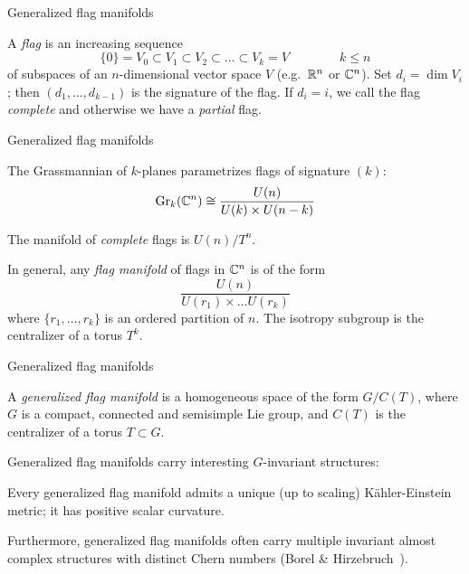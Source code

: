 \documentclass[11pt,parskip]{beamer}
\begin{document}
\begin{frame}{Generalized flag manifolds}
	\begin{mydef}
		A \emph{flag} is an increasing sequence 
		\begin{equation*}
			\{0\}=V_0\subset V_1 \subset V_2 \subset \dots \subset V_k=V \qquad \qquad k\leq n
		\end{equation*}
		of subspaces of an $n$-dimensional vector space $V$ (e.g.~$\mathbb{R}^n$ or $\mathbb{C}^n$). Set $d_i=\dim V_i$; then $(d_1,\dots, d_{k-1})$ is the signature of the flag. If $d_i=i$, we call the flag \emph{complete} and otherwise we have a \emph{partial} flag. 
	\end{mydef}	
\end{frame}
\begin{frame}{Generalized flag manifolds}
	\begin{ex}
		\begin{letteredlist}
			\item The Grassmannian of $k$-planes parametrizes flags of signature $(k)$:
			\begin{equation*}
				\operatorname{Gr}_k(\mathbb{C}^n)\cong \frac{U(n)}{U(k)\times U(n-k)}
			\end{equation*}\pause
			\item The manifold of \emph{complete} flags is $U(n)/T^n$.\pause
			\item In general, any \emph{flag manifold} of flags in $\mathbb{C}^n$ is of the form
			\begin{equation*}
				\frac{U(n)}{U(r_1)\times\dots U(r_k)}
			\end{equation*}
			where $\{r_1,\dots,r_k\}$ is an ordered partition of $n$. The isotropy subgroup is the centralizer of a torus $T^k$.
		\end{letteredlist}
	\end{ex}
\end{frame}
\begin{frame}{Generalized flag manifolds}
	\begin{mydef}
		A \emph{generalized flag manifold} is a homogeneous space of the form $G/C(T)$, where $G$ is a compact, connected and semisimple Lie group, and $C(T)$ is the centralizer of a torus $T\subset G$.
	\end{mydef}
	Generalized flag manifolds carry interesting $G$-invariant structures:\pause
	
	\begin{thm}
		Every generalized flag manifold admits a unique (up to scaling) K\"ahler-Einstein metric; it has positive scalar curvature.
	\end{thm}\pause
	
	Furthermore, generalized flag manifolds often carry multiple invariant almost complex structures with distinct Chern numbers (Borel \& Hirzebruch~\cite{BH1958}).
\end{frame}
\end{document}
